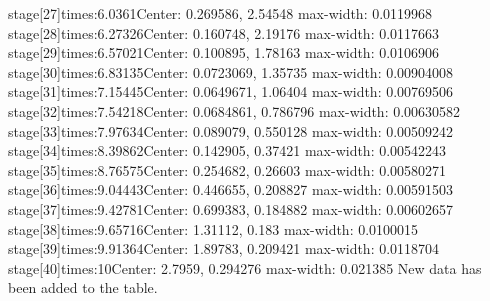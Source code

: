 stage[27]times:6.0361Center:{ 0.269586, 2.54548 } max-width: 0.0119968
stage[28]times:6.27326Center:{ 0.160748, 2.19176 } max-width: 0.0117663
stage[29]times:6.57021Center:{ 0.100895, 1.78163 } max-width: 0.0106906
stage[30]times:6.83135Center:{ 0.0723069, 1.35735 } max-width: 0.00904008
stage[31]times:7.15445Center:{ 0.0649671, 1.06404 } max-width: 0.00769506
stage[32]times:7.54218Center:{ 0.0684861, 0.786796 } max-width: 0.00630582
stage[33]times:7.97634Center:{ 0.089079, 0.550128 } max-width: 0.00509242
stage[34]times:8.39862Center:{ 0.142905, 0.37421 } max-width: 0.00542243
stage[35]times:8.76575Center:{ 0.254682, 0.26603 } max-width: 0.00580271
stage[36]times:9.04443Center:{ 0.446655, 0.208827 } max-width: 0.00591503
stage[37]times:9.42781Center:{ 0.699383, 0.184882 } max-width: 0.00602657
stage[38]times:9.65716Center:{ 1.31112, 0.183 } max-width: 0.0100015
stage[39]times:9.91364Center:{ 1.89783, 0.209421 } max-width: 0.0118704
stage[40]times:10Center:{ 2.7959, 0.294276 } max-width: 0.021385
New data has been added to the table.

